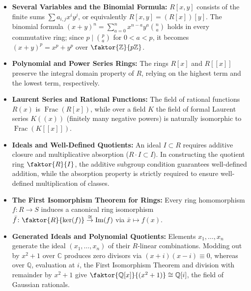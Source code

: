 \begin{overview}
\begin{itemize}
    \item \textbf{Several Variables and the Binomial Formula:} $R[x, y]$ consists of the finite sums $\sum a_{i,j} x^i y^j$, or equivalently $R[x, y] = (R[x])[y]$. The binomial formula $(x + y)^n = \sum_{a=0}^n x^{n-a} y^a \binom{n}{a}$ holds in every commutative ring; since $p \mid \binom{p}{a}$ for $0 < a < p$, it becomes $(x + y)^p = x^p + y^p$ over $\faktor{\mathbb{Z}}{p\mathbb{Z}}$.
    \item \textbf{Polynomial and Power Series Rings:} The rings $R[x]$ and $R[[x]]$ preserve the integral domain property of $R$, relying on the highest term and the lowest term, respectively.
    \item \textbf{Laurent Series and Rational Functions:} The field of rational functions $R(x)$ is $\operatorname{Frac}(R[x])$, while over a field $K$ the field of formal Laurent series $K((x))$ (finitely many negative powers) is naturally isomorphic to $\operatorname{Frac}(K[[x]])$.
    \item \textbf{Ideals and Well-Defined Quotients:} An ideal $I \subset R$ requires additive closure and multiplicative absorption ($R \cdot I \subset I$). In constructing the quotient ring $\faktor{R}{I}$, the additive subgroup condition guarantees well-defined addition, while the absorption property is strictly required to ensure well-defined multiplication of classes.
    \item \textbf{The First Isomorphism Theorem for Rings:} Every ring homomorphism $f \colon R \to S$ induces a canonical ring isomorphism $\bar{f} \colon \faktor{R}{\ker(f)} \overset{\cong}{\to} \operatorname{Im}(f)$ via $\bar{x} \mapsto f(x)$.
    \item \textbf{Generated Ideals and Polynomial Quotients:} Elements $x_1, \dots, x_n$ generate the ideal $(x_1, \dots, x_n)$ of their $R$-linear combinations. Modding out by $x^2+1$ over $\mathbb{C}$ produces zero divisors via $(x+i)(x-i) \equiv 0$, whereas over $\mathbb{Q}$, evaluation at $i$, the First Isomorphism Theorem and division with remainder by $x^2 + 1$ give $\faktor{\mathbb{Q}[x]}{(x^2+1)} \cong \mathbb{Q}[i]$, the field of Gaussian rationals.
\end{itemize}
\end{overview}
